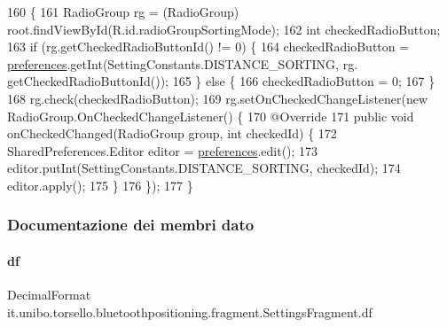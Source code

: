 \begin{DoxyCode}
160                                        \{
161         RadioGroup rg = (RadioGroup) root.findViewById(R.id.radioGroupSortingMode);
162         \textcolor{keywordtype}{int} checkedRadioButton;
163         \textcolor{keywordflow}{if} (rg.getCheckedRadioButtonId() != 0) \{
164             checkedRadioButton = \hyperlink{classit_1_1unibo_1_1torsello_1_1bluetoothpositioning_1_1fragment_1_1SettingsFragment_a52480c4d5d81ca59fe4a98ae3c623ea4_a52480c4d5d81ca59fe4a98ae3c623ea4}{preferences}.getInt(SettingConstants.DISTANCE\_SORTING, rg.
      getCheckedRadioButtonId());
165         \} \textcolor{keywordflow}{else} \{
166             checkedRadioButton = 0;
167         \}
168         rg.check(checkedRadioButton);
169         rg.setOnCheckedChangeListener(\textcolor{keyword}{new} RadioGroup.OnCheckedChangeListener() \{
170             @Override
171             \textcolor{keyword}{public} \textcolor{keywordtype}{void} onCheckedChanged(RadioGroup group, \textcolor{keywordtype}{int} checkedId) \{
172                 SharedPreferences.Editor editor = \hyperlink{classit_1_1unibo_1_1torsello_1_1bluetoothpositioning_1_1fragment_1_1SettingsFragment_a52480c4d5d81ca59fe4a98ae3c623ea4_a52480c4d5d81ca59fe4a98ae3c623ea4}{preferences}.edit();
173                 editor.putInt(SettingConstants.DISTANCE\_SORTING, checkedId);
174                 editor.apply();
175             \}
176         \});
177     \}
\end{DoxyCode}


\subsubsection{Documentazione dei membri dato}
\hypertarget{classit_1_1unibo_1_1torsello_1_1bluetoothpositioning_1_1fragment_1_1SettingsFragment_af6b80a700dc80c39a56d001b68a47694_af6b80a700dc80c39a56d001b68a47694}{}\label{classit_1_1unibo_1_1torsello_1_1bluetoothpositioning_1_1fragment_1_1SettingsFragment_af6b80a700dc80c39a56d001b68a47694_af6b80a700dc80c39a56d001b68a47694} 
\paragraph{\texorpdfstring{df}{df}}
{\footnotesize\ttfamily Decimal\+Format it.\+unibo.\+torsello.\+bluetoothpositioning.\+fragment.\+Settings\+Fragment.\+df\hspace{0.3cm}{\ttfamily [private]}}

